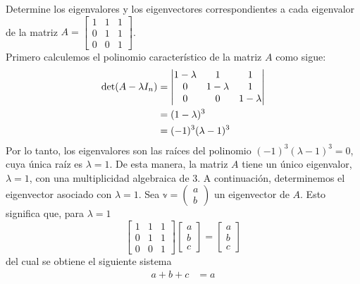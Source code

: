 \begin{example}
    Determine los eigenvalores y los eigenvectores correspondientes a cada eigenvalor de la matriz $A = \begin{bmatrix}
        1 & 1 & 1 \\
        0 & 1 & 1 \\
        0 & 0 & 1
    \end{bmatrix}$. \\
    \solucion Primero calculemos el polinomio característico de la matriz $A$ como sigue:
    \begin{align*}
        \operatorname{det}(A - \lambda I_n) & = \begin{vmatrix}
            1 - \lambda & 1 & 1 \\
            0 & 1 - \lambda & 1 \\
            0 & 0 & 1 - \lambda
        \end{vmatrix} \\
        & = (1 - \lambda)^3 \\
        & = (-1)^3 (\lambda - 1)^3
    \end{align*}\newpage\noindent
    Por lo tanto, los eigenvalores son las raíces del polinomio $(-1)^3 (\lambda - 1)^3 = 0$, cuya única raíz es $\lambda = 1$. De esta manera, la matriz $A$ tiene un único eigenvalor, $\lambda = 1$, con una multiplicidad algebraica de $3$. A continuación, determinemos el eigenvector asociado con $\lambda = 1$. Sea $\mathbb{v} = \begin{pmatrix} a \\ b \end{pmatrix}$ un eigenvector de $A$. Esto significa que, para $\lambda = 1$
    $$\begin{bmatrix}
        1 & 1 & 1 \\
        0 & 1 & 1 \\
        0 & 0 & 1
    \end{bmatrix} \begin{bmatrix}
        a \\
        b \\
        c
    \end{bmatrix} = \begin{bmatrix}
        a \\
        b \\
        c
    \end{bmatrix}$$
    del cual se obtiene el siguiente sistema
    \begin{align*}
        a + b + c & = a \\

\end{align*}
\end{example}
